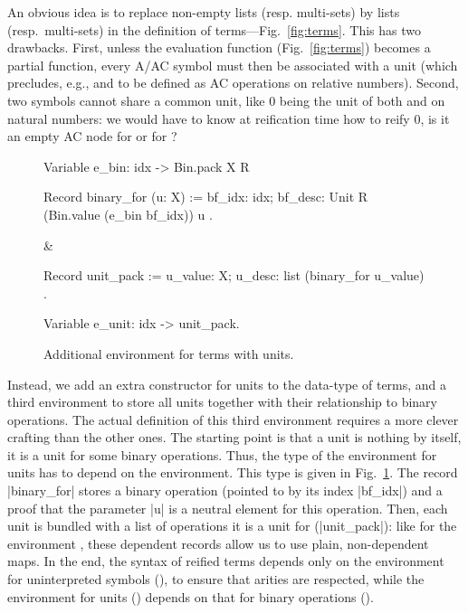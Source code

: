 \documentclass{llncs}
\begin{document}
An obvious idea is to replace non-empty lists (resp. multi-sets) by
lists (resp.\ multi-sets) in the definition of
terms---Fig.~\ref{fig:terms}. This has two drawbacks. First, unless
the evaluation function (Fig.~\ref{fig:terms}) becomes a partial
function, every A/AC symbol must then be associated with a unit (which
precludes, e.g.,  and  to be defined as AC
operations on relative numbers).  Second, two symbols cannot share a
common unit, like $0$ being the unit of both  and
 on natural numbers: we would have to know at reification
time how to reify 0, is it an empty AC node for  or for
?
\begin{figure}[t]
\begin{twolistings}
\begin{coq}
Variable e_bin: idx -> Bin.pack X R      

Record binary_for (u: X) := {            
 bf_idx: idx;                                     
 bf_desc: Unit R (Bin.value (e_bin bf_idx)) u }.
\end{coq}
&
\begin{coq}
Record unit_pack := {
 u_value: X;
 u_desc: list (binary_for u_value) }.    

Variable e_unit: idx -> unit_pack.
\end{coq}
\end{twolistings}
\caption{Additional environment for terms with units.}
\label{fig:dec-syntax}
\end{figure}
Instead, we add an extra constructor for units to the
data-type of terms, and a third environment to store all units
together with their relationship to binary operations.
The actual definition of this third environment requires a more clever
crafting than the other ones. The starting point is that a unit is
nothing by itself, it is a unit for some binary operations.
Thus, the type of the environment for units has to depend on the
 environment.
This type is given in Fig.~\ref{fig:dec-syntax}. The record
\coqinline|binary_for| stores a binary operation (pointed to by its
index \coqinline|bf_idx|) and a proof that the parameter \coqinline|u|
is a neutral element for this operation. Then, each unit is bundled
with a list of operations it is a unit for (\coqinline|unit_pack|):
like for the environment , these dependent records allow
us to use plain, non-dependent maps.
In the end, the syntax of reified terms depends only on the
environment for uninterpreted symbols (), to ensure that
arities are respected, while the environment for units ()
depends on that for binary operations ().
\end{document}
